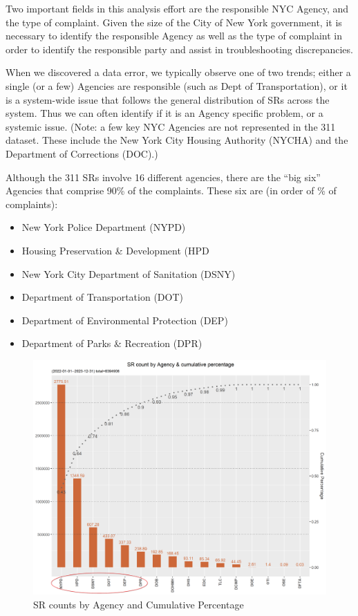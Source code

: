 \documentclass[12pt, titlepage]{article}
\begin{document}
\FloatBarrier %

Two important fields in this analysis effort are the responsible NYC Agency, and the type of complaint.
Given the size of the City of New York government, it is necessary to identify the responsible Agency as well as the type of complaint in order to 
identify the responsible party and assist in troubleshooting discrepancies.

When we discovered a data error, we typically observe one of two trends; either a single (or a few) Agencies are responsible (such as Dept of Transportation), 
or it is a system-wide issue that follows the general distribution of  SRs across the system. 
Thus we can often identify if it is an Agency specific problem, or a systemic issue.  (Note: a few key NYC Agencies are not 
represented in the 311 dataset. These include the New York City Housing Authority (NYCHA) and the
Department of Corrections (DOC).)

Although the 311 SRs involve 16 different agencies, there are the ``big six'' Agencies that comprise
90\% of the complaints. These six are (in order of \% of complaints):  

\begin{itemize}
	\item New York Police Department (NYPD)
	\item Housing Preservation \& Development (HPD
	\item New York City Department of Sanitation (DSNY)
	\item Department of Transportation (DOT)
	\item Department of Environmental Protection (DEP)
	\item Department of Parks \& Recreation (DPR)
\end{itemize}

\begin{figure}[H]
  \centering
	  \includegraphics[width=\textwidth]{SRs_by_Agency.png}
	  \caption{SR counts by Agency and Cumulative Percentage}
	  
\end{figure}
\end{document}
